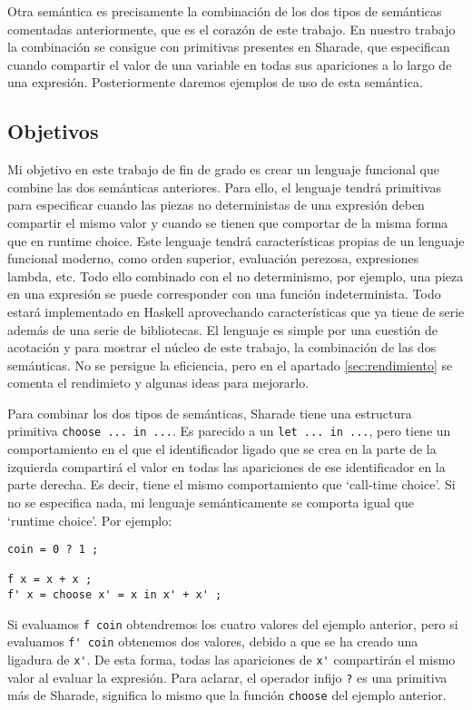 \documentclass[class=article, crop=false]{standalone}
\begin{document}
Otra semántica es precisamente la combinación de los dos tipos de semánticas comentadas
anteriormente, que es el corazón de este trabajo. En nuestro trabajo la combinación se
consigue con primitivas presentes en Sharade, que especifican cuando compartir el valor de
una variable en todas sus apariciones a lo largo de una expresión. Posteriormente daremos
ejemplos de uso de esta semántica.

\subsection{Objetivos}
Mi objetivo en este trabajo de fin de grado es crear un lenguaje funcional que combine las
dos semánticas anteriores. Para ello, el lenguaje tendrá primitivas para especificar cuando
las piezas no deterministas de una expresión deben compartir el mismo valor y cuando se
tienen que comportar de la misma forma que en runtime choice. Este lenguaje tendrá
características propias de un lenguaje funcional moderno, como orden superior, evaluación
perezosa, expresiones lambda, etc. Todo ello combinado con el no determinismo, por ejemplo,
una pieza en una expresión se puede corresponder con una función indeterminista. Todo estará
implementado en Haskell aprovechando características que ya tiene de serie además de una
serie de bibliotecas. El lenguaje es simple por una cuestión de acotación y para mostrar el
núcleo de este trabajo, la combinación de las dos semánticas. No se persigue la eficiencia,
pero en el apartado \ref{sec:rendimiento} se comenta el rendimieto y algunas ideas para
mejorarlo.

Para combinar los dos tipos de semánticas, Sharade tiene una estructura primitiva
\verb`choose ... in ...`. Es parecido a un \verb`let ... in ...`, pero tiene un
comportamiento en el que el identificador ligado que se crea en la parte de la izquierda
compartirá el valor en todas las apariciones de ese identificador en la parte derecha. Es
decir, tiene el mismo comportamiento que `call-time choice'. Si no se especifica nada, mi
lenguaje semánticamente se comporta igual que `runtime choice'. Por ejemplo:

\begin{verbatim}
coin = 0 ? 1 ;

f x = x + x ;
f' x = choose x' = x in x' + x' ;
\end{verbatim}

Si evaluamos \verb`f coin` obtendremos los cuatro valores del ejemplo anterior, pero si
evaluamos \verb`f' coin` obtenemos dos valores, debido a que se ha creado una ligadura de
\verb`x'`. De esta forma, todas las apariciones de \verb`x'` compartirán el mismo valor al
evaluar la expresión. Para aclarar, el operador infijo \verb`?` es una primitiva más de
Sharade, significa lo mismo que la función \verb`choose` del ejemplo anterior.
\end{document}

